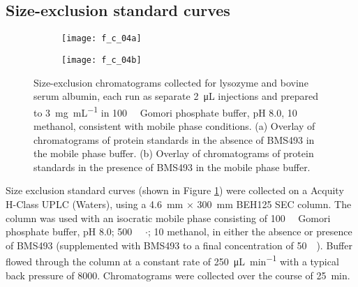\begin{refsection}
\section{Size-exclusion standard curves}
\begin{figure}
    \centering
    \begin{subfigure}[b]{0.8\textwidth}
        \texttt{[image: f\_c\_04a]}
        \caption{}
    \end{subfigure}
    \begin{subfigure}[b]{0.8\textwidth}
        \texttt{[image: f\_c\_04b]}
        \caption{}
    \end{subfigure}
    \caption{Size-exclusion chromatograms collected for lysozyme and bovine
        serum albumin, each run as separate \SI{2}{\micro\liter} injections and
        prepared to \SI{3}{\mg\per\mL} in \SI{100}{\milli\moLar} Gomori
        phosphate buffer, pH 8.0, \SI{10}{\volper} methanol, consistent with
        mobile phase conditions. (a) Overlay of chromatograms of protein
        standards in the absence of BMS493 in the mobile phase buffer. (b)
        Overlay of chromatograms of protein standards in the presence of BMS493
        in the mobile phase buffer.}\label{fig:sec_standards}
\end{figure}


Size exclusion standard curves (shown in Figure \ref{fig:sec_standards}) were collected on a Acquity H-Class UPLC
(Waters), using a \SI{4.6}{\mm} ${\times}$ \SI{300}{\mm} BEH125 SEC column. The
column was used with an isocratic mobile phase consisting of
\SI{100}{\milli\moLar} Gomori phosphate buffer, pH 8.0;
\SI{500}{\milli\moLar} ${\cdot}$;
\SI{10}{\volper} methanol, 
in either the absence or presence of BMS493 (supplemented with BMS493 to a final
concentration of \SI{50}{\micro\moLar}). Buffer flowed through the column at a
constant rate of \SI{250}{\uL\per\minute} with a typical back pressure of
\SI{8000}{\psi}. Chromatograms were collected over the
course of \SI{25}{\minute}.


\end{refsection}

